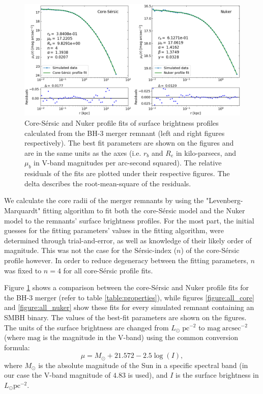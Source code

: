 \documentclass[english, oneside]{HYgradu}
\begin{document}
\begin{figure}[h]
	\centering
	\includegraphics[width=\textwidth]{core_nuker_fits.png}
	\caption{Core-Sérsic and Nuker profile fits of surface brightness profiles calculated from the BH-3 merger remnant (left and right figures respectively). The best fit parameters are shown on the figures and are in the same units as the axes (i.e. $r_b$ and $R_e$ in kilo-parsecs, and $\mu_b$ in V-band magnitudes per arc-second squared). The relative residuals of the fits are plotted under their respective figures. The delta describes the root-mean-square of the residuals.}
	\label{figure:core_nuker}
\end{figure}

We calculate the core radii of the merger remnants by using the "Levenberg-Marquardt" fitting algorithm to fit both the core-Sérsic model and the Nuker model to the remnants' surface brightness profiles. For the most part, the initial guesses for the fitting parameters' values in the fitting algorithm, were determined through trial-and-error, as well as knowledge of their likely order of magnitude. This was not the case for the Sérsic-index ($n$) of the core-Sérsic profile however. In order to reduce degeneracy between the fitting parameters, $n$ was fixed to $n=4$ for all core-Sérsic profile fits.

Figure \ref{figure:core_nuker} shows a comparison between the core-Sérsic and Nuker profile fits for the BH-3 merger (refer to table \ref{table:properties}), while figures \ref{figure:all_core} and \ref{figure:all_nuker} show these fits for every simulated remnant containing an SMBH binary. The values of the best-fit parameters are shown on the figures. The units of the surface brightness are changed from $L_\odot \; \mathrm{pc^{-2}}$ to $\mathrm{mag \; arcsec^{-2}}$ (where $\mathrm{mag}$ is the magnitude in the V-band) using the common conversion formula:
\begin{equation}
\mu = M_\odot + 21.572 - 2.5 \log(I), 
\end{equation}
where $M_\odot$ is the absolute magnitude of the Sun in a specific spectral band (in our case the V-band magnitude of $4.83$ is used), and $I$ is the surface brightness in $L_\odot \mathrm{pc^{-2}}$.
\end{document}
